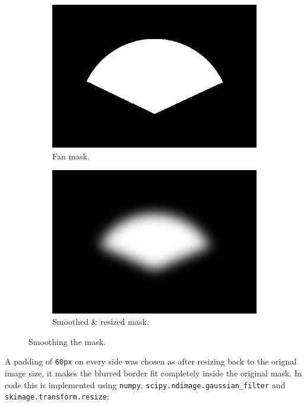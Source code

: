 \begin{figure}[H]
    \centering
    \begin{subfigure}[b]{.45\textwidth}
        \centering
        \includegraphics[width=\textwidth]{figures/pipeline/Mask.png}
        \caption{Fan mask.}
    \end{subfigure}
    \hfill
    \begin{subfigure}[b]{.45\textwidth}
        \centering
        \includegraphics[width=\textwidth]{figures/pipeline/MaskBlurred.png}
        \caption{Smoothed \& resized mask.}
    \end{subfigure}
    \caption{Smoothing the mask.}
    \label{fig:mask-smoothing}
\end{figure}

A padding of \texttt{60px} on every side was chosen as after resizing back to the orignal image size, it makes the blurred border fit completely inside the original mask. In code this is implemented using \texttt{numpy}, \texttt{scipy.ndimage.gaussian\_filter} and \texttt{skimage.transform.resize}:

